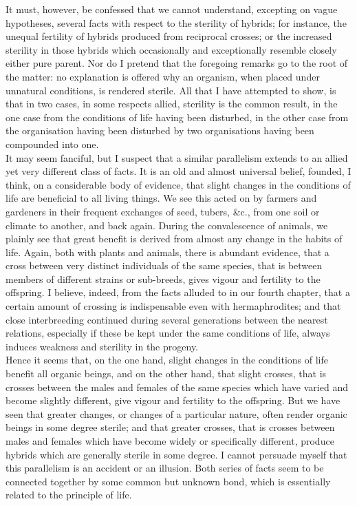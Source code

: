 \indent It must, however, be confessed that we cannot understand, excepting on vague hypotheses, several facts with respect to the sterility of hybrids; for instance, the unequal fertility of hybrids produced from reciprocal crosses; or the increased sterility in those hybrids which occasionally and exceptionally resemble closely either pure parent. Nor do I pretend that the foregoing remarks go to the root of the matter: no explanation is offered why an organism, when placed under unnatural conditions, is rendered sterile. All that I have attempted to show, is that in two cases, in some respects allied, sterility is the common result, in the one case from the conditions of life having been disturbed, in the other case from the organisation having been disturbed by two organisations having been compounded into one.\\
\indent It may seem fanciful, but I suspect that a similar parallelism extends to an allied yet very different class of facts. It is an old and almost universal belief, founded, I think, on a considerable body of evidence, that slight changes in the conditions of life are beneficial to all living things. We see this acted on by farmers and gardeners in their frequent exchanges of seed, tubers, \&c., from one soil or climate to another, and back again. During the convalescence of animals, we plainly see that great benefit is derived from almost any change in the habits of life. Again, both with plants and animals, there is abundant evidence, that a cross between very distinct individuals of the same species, that is between members of different strains or sub-breeds, gives vigour and fertility to the offspring. I believe, indeed, from the facts alluded to in our fourth chapter, that a certain amount of crossing is indispensable even with hermaphrodites; and that close interbreeding continued during several generations between the nearest relations, especially if these be kept under the same conditions of life, always induces weakness and sterility in the progeny.\\
\indent Hence it seems that, on the one hand, slight changes in the conditions of life benefit all organic beings, and on the other hand, that slight crosses, that is crosses between the males and females of the same species which have varied and become slightly different, give vigour and fertility to the offspring. But we have seen that greater changes, or changes of a particular nature, often render organic beings in some degree sterile; and that greater crosses, that is crosses between males and females which have become widely or specifically different, produce hybrids which are generally sterile in some degree. I cannot persuade myself that this parallelism is an accident or an illusion. Both series of facts seem to be connected together by some common but unknown bond, which is essentially related to the principle of life.\\
